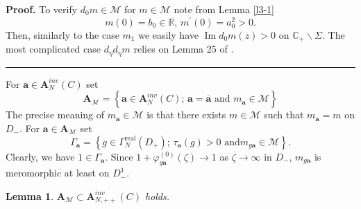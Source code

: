 \documentclass[a4paper]{article}%
\newtheorem{lemma}{Lemma}
\newenvironment{proof}[1][Proof]{\noindent\textbf{#1.} }{\ \rule{0.5em}{0.5em}}
\begin{document}
\begin{proof}
To verify $d_{0}m\in\mathcal{M}$ for $m\in\mathcal{M}$ note from Lemma
\ref{l3-1}%
\[
m\left(  0\right)  =b_{0}\in\mathbb{R}\text{, \ }m^{\prime}(0)=a_{0}%
^{2}>0\text{.}%
\]
Then, similarly to the case $m_{1}$ we easily have $\operatorname{Im}%
d_{0}m\left(  z\right)  >0$ on $\mathbb{C}_{+}\backslash\Sigma$. The most
complicated case $d_{\eta}d_{\overline{\eta}}m$ relies on Lemma 25 of
\cite{z}.\bigskip
\end{proof}

For $\boldsymbol{a}\in\boldsymbol{A}_{N}^{inv}\left(  C\right)  $ set%
\begin{equation}
\boldsymbol{A}_{\mathcal{M}}=\left\{  \boldsymbol{a}\in\boldsymbol{A}%
_{N}^{inv}\left(  C\right)  \text{; \ }\boldsymbol{a}=\overline{\boldsymbol{a}%
}\text{ and }m_{\boldsymbol{a}}\in\mathcal{M}\right\}  \label{3-3}%
\end{equation}
The precise meaning of $m_{\boldsymbol{a}}\in\mathcal{M}$ is that there exists
$m\in\mathcal{M}$ such that $m_{\boldsymbol{a}}=m$ on $D_{-}$. For
$\boldsymbol{a}\in\boldsymbol{A}_{\mathcal{M}}$ set
\[
\Gamma_{\boldsymbol{a}}=\left\{  g\in\Gamma_{N}^{\operatorname{real}}\left(
D_{+}\right)  \text{; }\tau_{\boldsymbol{a}}\left(  g\right)  >0\text{ and
}m_{g\boldsymbol{a}}\in\mathcal{M}\right\}  \text{.}%
\]
Clearly, we have $1\in\Gamma_{\boldsymbol{a}}$. Since $1+\varphi
_{g\boldsymbol{a}}^{\left(  0\right)  }\left(  \zeta\right)  \rightarrow1$ as
$\zeta\rightarrow\infty$ in $D_{-}$, $m_{g\boldsymbol{a}}$ is meromorphic at
least on $D_{-}^{1}$.

\begin{lemma}
\label{l3-3}$\boldsymbol{A}_{\mathcal{M}}\subset\boldsymbol{A}_{N,++}%
^{inv}\left(  C\right)  $ holds.
\end{lemma}
\end{document}
